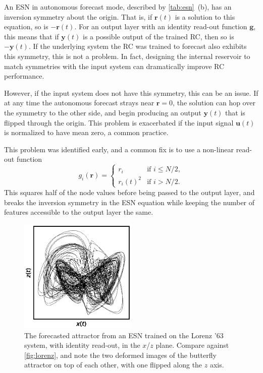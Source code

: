 An ESN in autonomous forecast mode, described by \cref{tab:esn}~(b),
has an inversion symmetry about the origin. That is, if $\bm{r}(t)$ is
a solution to this equation, so is $-\bm{r}(t)$. For an output layer
with an identity read-out function $\bm{g}$, this means that if
$\bm{y}(t)$ is a possible output of the trained RC, then so is
$-\bm{y}(t)$. If the underlying system the RC was trained to forecast
also exhibits this symmetry, this is not a problem. In fact, designing
the internal reservoir to match symmetries with the input system can
dramatically improve RC performance\cite{barbosa2021}.

However, if the input system does not have this symmetry, this can be
an issue. If at any time the autonomous forecast strays near $\bm{r} =
0$, the solution can hop over the symmetry to the other side, and
begin producing an output $\bm{y}(t)$ that is flipped through the
origin. This problem is exacerbated if the input signal $\bm{u}(t)$ is
normalized to have mean zero, a common practice.

This problem was identified early, and a common fix\cite{pathak2017,herteux2020}
is to use a non-linear read-out function
\begin{equation}
  g_i(\bm{r}) = \begin{cases}
    r_i & \text{if } i \leq N / 2, \\
    r_i(t)^2 & \text{if } i > N / 2.
  \end{cases}
  \label{eq:esn-break-sym}
\end{equation}
This squares half of the node values before being passed
to the output layer, and breaks the inversion symmetry in the ESN
equation while keeping the number of features accessible to the output
layer the same.

\begin{figure}
  \includegraphics[width=0.5\textwidth]{figures/lorenz-symmetry}
  \caption{The forecasted attractor from an ESN trained on the Lorenz
    '63 system, with identity read-out, in the $x$/$z$ plane. Compare
    against \cref{fig:lorenz}, and note the two deformed images of the
    butterfly attractor on top of each other, with one flipped along
    the $z$ axis.}
  \label{fig:lorenz-symmetry}
\end{figure}

